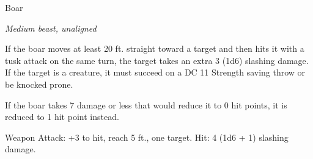 \begin{monsterbox}{Boar}
\begin{hangingpar}
\textit{Medium beast, unaligned}
\end{hangingpar}
\dndline%
\basics[%
armorclass = 11,
hitpoints = 2d8 + 2,
speed = {40 ft.}
]
\dndline%
\stats[%
STR = \stat{13},
DEX = \stat{11},
CON = \stat{12},
INT = \stat{2},
WIS = \stat{9},
CHA = \stat{5}
]
\dndline%
\details[%
skills={},
damageimmunities={},
savingthrows={},
conditionimmunities={},
damageresistances={},
damagevulnerabilities={},
senses={passive Perception 9},
challenge=1/4
]
\dndline%
\begin{monsteraction}[Charge]
If the boar moves at least 20 ft. straight toward a target and then hits it with a tusk attack on the same turn, the target takes an extra 3 (1d6) slashing damage. If the target is a creature, it must succeed on a DC 11 Strength saving throw or be knocked prone.
\end{monsteraction}
\begin{monsteraction}
If the boar takes 7 damage or less that would reduce it to 0 hit points, it is reduced to 1 hit point instead.
\end{monsteraction}
\begin{monsteraction}[Tusk]
Weapon Attack: +3 to hit, reach 5 ft., one target. Hit: 4 (1d6 + 1) slashing damage.
\end{monsteraction}
\end{monsterbox}